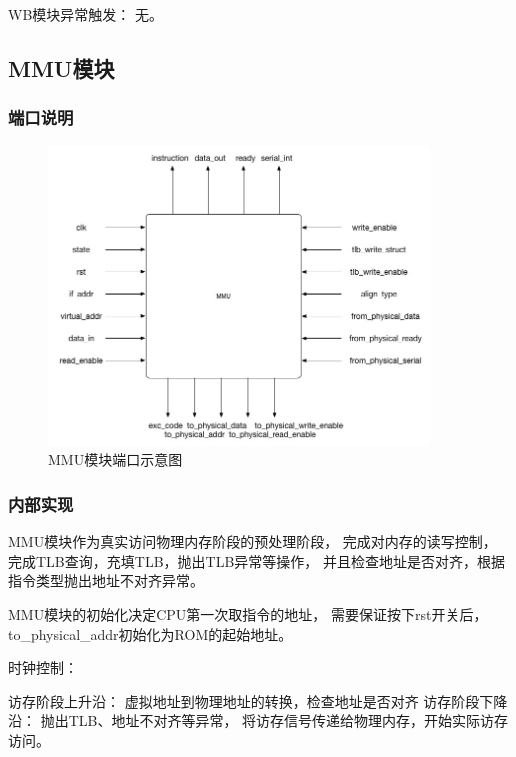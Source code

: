             WB模块异常触发：%
	        无。

    \subsection{MMU模块}
        \subsubsection{端口说明}
            
            \begin{figure}[!hbp]
                \centering
                \caption{MMU模块端口示意图}
                \includegraphics[width=0.9\textwidth]{chart/mmu.jpg}
            \end{figure}
        \subsubsection{内部实现}
            MMU模块作为真实访问物理内存阶段的预处理阶段，%
            完成对内存的读写控制，%
            完成TLB查询，充填TLB，抛出TLB异常等操作，%
            并且检查地址是否对齐，根据指令类型抛出地址不对齐异常。
            
            MMU模块的初始化决定CPU第一次取指令的地址，%
            需要保证按下rst开关后，%
            to\_physical\_addr初始化为ROM的起始地址。

            时钟控制：
            \begin{minipage}[t]{0.8\linewidth}
                访存阶段上升沿：%
                    虚拟地址到物理地址的转换，检查地址是否对齐%
                访存阶段下降沿：%
                    抛出TLB、地址不对齐等异常，%
                    将访存信号传递给物理内存，开始实际访存访问。%
            \end{minipage}
            
